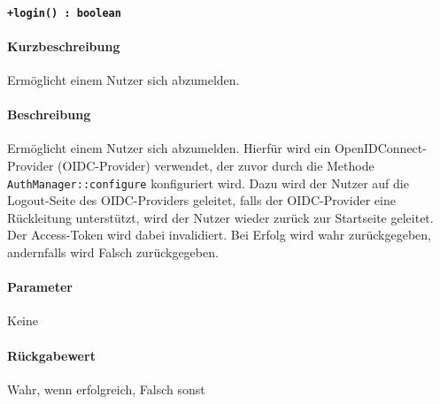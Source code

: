 \paragraph{\texttt{+login() : boolean}}%
\paragraph*{Kurzbeschreibung}
Ermöglicht einem Nutzer sich abzumelden.
\paragraph*{Beschreibung}
Ermöglicht einem Nutzer sich abzumelden.
Hierfür wird ein OpenIDConnect-Provider (OIDC-Provider) verwendet, der zuvor durch die Methode \verb#AuthManager::configure# konfiguriert wird.
Dazu wird der Nutzer auf die Logout-Seite des OIDC-Providers geleitet, falls der OIDC-Provider eine Rückleitung unterstützt, wird der Nutzer wieder zurück zur Startseite geleitet.
Der Access-Token wird dabei invalidiert.
Bei Erfolg wird wahr zurückgegeben, andernfalls wird Falsch zurückgegeben.
\paragraph*{Parameter}
Keine
\paragraph*{Rückgabewert}
Wahr, wenn erfolgreich, Falsch sonst
